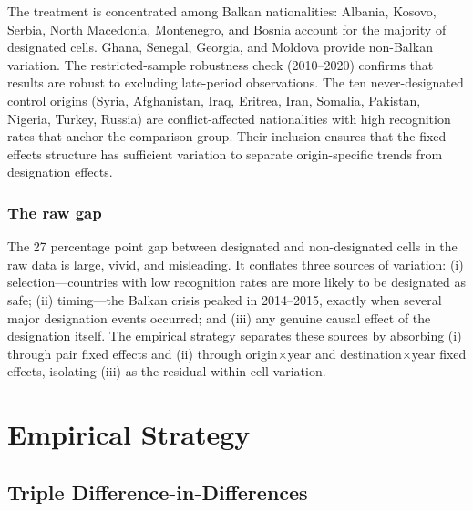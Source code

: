 \documentclass[12pt]{article}
\begin{document}
The treatment is concentrated among Balkan nationalities: Albania, Kosovo, Serbia, North Macedonia, Montenegro, and Bosnia account for the majority of designated cells. Ghana, Senegal, Georgia, and Moldova provide non-Balkan variation. The restricted-sample robustness check (2010--2020) confirms that results are robust to excluding late-period observations. The ten never-designated control origins (Syria, Afghanistan, Iraq, Eritrea, Iran, Somalia, Pakistan, Nigeria, Turkey, Russia) are conflict-affected nationalities with high recognition rates that anchor the comparison group. Their inclusion ensures that the fixed effects structure has sufficient variation to separate origin-specific trends from designation effects.

\subsubsection*{The raw gap} The 27 percentage point gap between designated and non-designated cells in the raw data is large, vivid, and misleading. It conflates three sources of variation: (i) selection---countries with low recognition rates are more likely to be designated as safe; (ii) timing---the Balkan crisis peaked in 2014--2015, exactly when several major designation events occurred; and (iii) any genuine causal effect of the designation itself. The empirical strategy separates these sources by absorbing (i) through pair fixed effects and (ii) through origin$\times$year and destination$\times$year fixed effects, isolating (iii) as the residual within-cell variation.



\section{Empirical Strategy}

\subsection{Triple Difference-in-Differences}
\end{document}
